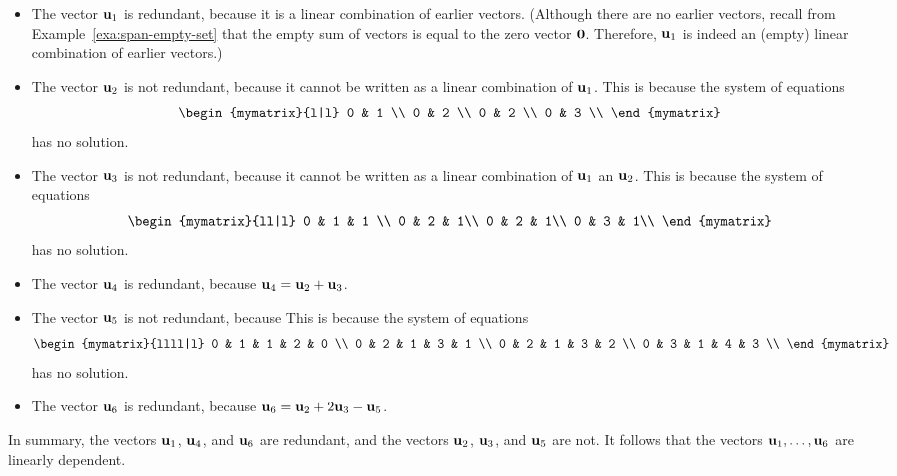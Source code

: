 \begin{solution}
  \begin{itemize}
  \item The vector $\mbox{\bf u}_1$ is redundant, because it is a linear
    combination of earlier vectors. (Although there are no earlier
    vectors, recall from Example~\ref{exa:span-empty-set} that the empty
    sum of vectors is equal to the zero vector $\mbox{\bf 0}$. Therefore,
    $\mbox{\bf u}_1$ is indeed an (empty) linear combination of earlier
    vectors.)
  \item The vector $\mbox{\bf u}_2$ is not redundant, because it cannot be
    written as a linear combination of $\mbox{\bf u}_1$. This is because
    the system of equations
    \begin{equation*}
      \begin{mymatrix}{l|l}
        0 & 1 \\
        0 & 2 \\
        0 & 2 \\
        0 & 3 \\
      \end{mymatrix}
    \end{equation*}
    has no solution.
  \item The vector $\mbox{\bf u}_3$ is not redundant, because it cannot be
    written as a linear combination of $\mbox{\bf u}_1$ an $\mbox{\bf u}_2$.
    This is because the system of equations
    \begin{equation*}
      \begin{mymatrix}{ll|l}
        0 & 1 & 1 \\
        0 & 2 & 1\\
        0 & 2 & 1\\
        0 & 3 & 1\\
      \end{mymatrix}
    \end{equation*}
    has no solution.
  \item The vector $\mbox{\bf u}_4$ is redundant, because $\mbox{\bf u}_4 =
    \mbox{\bf u}_2 + \mbox{\bf u}_3$.
  \item The vector $\mbox{\bf u}_5$ is not redundant, because 
    This is because the system of equations
    \begin{equation*}
      \begin{mymatrix}{llll|l}
        0 & 1 & 1 & 2 & 0 \\
        0 & 2 & 1 & 3 & 1 \\
        0 & 2 & 1 & 3 & 2 \\
        0 & 3 & 1 & 4 & 3 \\
      \end{mymatrix}
    \end{equation*}
    has no solution.
  \item The vector $\mbox{\bf u}_6$ is redundant, because $\mbox{\bf u}_6 =
    \mbox{\bf u}_2 + 2\mbox{\bf u}_3-\mbox{\bf u}_5$.
  \end{itemize}
  In summary, the vectors $\mbox{\bf u}_1$, $\mbox{\bf u}_4$, and $\mbox{\bf u}_6$
  are redundant, and the vectors $\mbox{\bf u}_2$, $\mbox{\bf u}_3$, and
  $\mbox{\bf u}_5$ are not. It follows that the vectors
  $\mbox{\bf u}_1,\ldots,\mbox{\bf u}_6$ are linearly dependent.
\end{solution}

